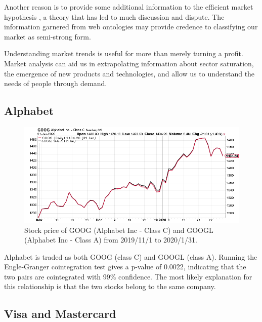\documentclass{UoYCSproject}
\begin{document}
Another reason is to provide some additional information to the efficient market hypothesis \parencite{efficientmarket}, a theory that has led to much discussion and dispute. The information garnered from web ontologies may provide credence to classifying our market as semi-strong form.

Understanding market trends is useful for more than merely turning a profit. Market analysis can aid us in extrapolating information about sector saturation, the emergence of new products and technologies, and allow us to understand the needs of people through demand.

\subsection{Alphabet}

\begin{figure}[h]
\begin{center}
\includegraphics[trim=0 0 0 15, clip, width=\linewidth]{"./images/GOOGGOOGL"}
\end{center}
\caption{Stock price of GOOG (Alphabet Inc - Class C) and GOOGL (Alphabet Inc - Class A) from 2019/11/1 to 2020/1/31.}
\end{figure}

Alphabet is traded as both GOOG (class C) and GOOGL (class A). Running the Engle-Granger cointegration test gives a p-value of 0.0022, indicating that the two pairs are cointegrated with 99\% confidence. The most likely explanation for this relationship is that the two stocks belong to the same company. 
\newpage
\subsection{Visa and Mastercard}
\end{document}

